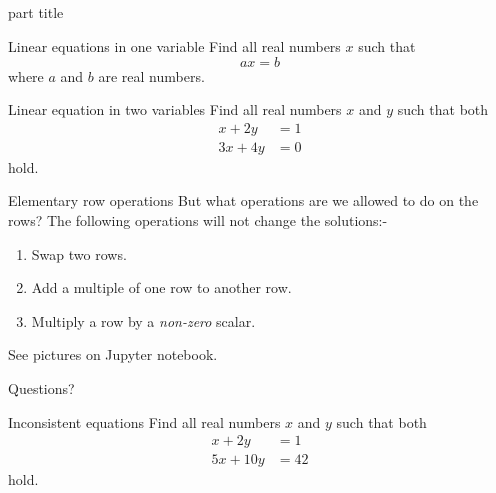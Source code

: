 \documentclass{beamer}
\begin{document}
\subsection{}

\begin{frame}
    \begin{beamercolorbox}[sep=12pt,center]{part title}
      \insertsection\par
    \end{beamercolorbox}
\end{frame}

\begin{frame}{Linear equations in one variable}
  Find all real numbers $x$ such that
  \begin{equation*}
    ax = b
  \end{equation*}
  where $a$ and $b$ are real numbers.
\end{frame}

\begin{frame}{Linear equation in two variables}
  Find all real numbers $x$ and $y$ such that both
  \begin{align*}
    x+2y&=1\\
    3x+4y&=0
  \end{align*}
  hold.
\end{frame}

\begin{frame}{Elementary row operations}
  But what operations are we allowed to do on the rows?\vfill
  The following operations will not change the solutions:-\vfill
  \begin{enumerate}
  \item Swap two rows.\vfill
  \item Add a multiple of one row to another row.\vfill
  \item Multiply a row by a \emph{non-zero} scalar.\vfill
  \end{enumerate}
  See pictures on Jupyter notebook.
\end{frame}


\begin{frame}
  Questions?
\end{frame}


\begin{frame}{Inconsistent equations}
  Find all real numbers $x$ and $y$ such that both
  \begin{align*}
    x+2y&=1\\
    5x+10y&=42
  \end{align*}
  hold.
\end{frame}
\end{document}
